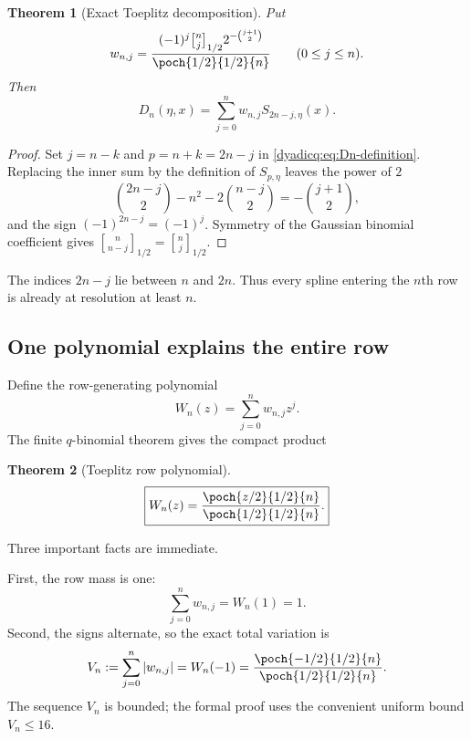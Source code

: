 \documentclass[11pt,oneside]{article}
\newtheorem{theorem}{Theorem}[section]
\theoremstyle{definition}
\theoremstyle{remark}
\newcommand{\qbinom}[3]{\genfrac{[}{]}{0pt}{}{#1}{#2}_{#3}}
\begin{document}
\begin{theorem}[Exact Toeplitz decomposition]\label{dyadicq:thm:Toeplitz-decomp}
Put
\begin{equation}\label{dyadicq:eq:wnj-definition}
 w_{n,j}=
 \frac{(-1)^j\qbinom{n}{j}{1/2}
 2^{-\binom{j+1}{2}}}
 {\poch{1/2}{1/2}{n}}
 \qquad(0\le j\le n).
\end{equation}
Then
\begin{equation}\label{dyadicq:eq:Toeplitz-decomp}
 \boxed{
  D_n(\eta,x)=\sum_{j=0}^{n}w_{n,j}S_{2n-j,\eta}(x).}
\end{equation}
\end{theorem}

\begin{proof}
Set $j=n-k$ and $p=n+k=2n-j$ in \eqref{dyadicq:eq:Dn-definition}.  Replacing the
inner sum by the definition of $S_{p,\eta}$ leaves the power of $2$
\[
 \binom{2n-j}{2}-n^2-2\binom{n-j}{2}
 =-\binom{j+1}{2},
\]
and the sign $(-1)^{2n-j}=(-1)^j$.  Symmetry of the Gaussian binomial
coefficient gives
$\qbinom{n}{n-j}{1/2}=\qbinom{n}{j}{1/2}$.
\end{proof}

The indices $2n-j$ lie between $n$ and $2n$.  Thus every spline entering the
$n$th row is already at resolution at least $n$.

\subsection{One polynomial explains the entire row}

Define the row-generating polynomial
\begin{equation}\label{dyadicq:eq:Wn-definition}
  W_n(z)=\sum_{j=0}^{n}w_{n,j}z^j.
\end{equation}
The finite $q$-binomial theorem gives the compact product
\begin{theorem}[Toeplitz row polynomial]\label{dyadicq:thm:row-polynomial}
\begin{equation}\label{dyadicq:eq:row-polynomial}
 \boxed{
 W_n(z)=\frac{\poch{z/2}{1/2}{n}}
              {\poch{1/2}{1/2}{n}}.}
\end{equation}
\end{theorem}

Three important facts are immediate.

First, the row mass is one:
\begin{equation}\label{dyadicq:eq:row-mass}
 \sum_{j=0}^{n}w_{n,j}=W_n(1)=1.
\end{equation}
Second, the signs alternate, so the exact total variation is
\begin{equation}\label{dyadicq:eq:row-TV}
 V_n:=\sum_{j=0}^{n}|w_{n,j}|
 =W_n(-1)
 =\frac{\poch{-1/2}{1/2}{n}}
        {\poch{1/2}{1/2}{n}}.
\end{equation}
The sequence $V_n$ is bounded; the formal proof uses the convenient uniform
bound $V_n\le16$.
\end{document}
